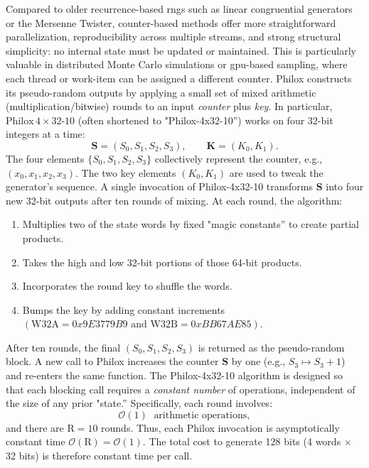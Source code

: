 Compared to older recurrence-based \acrshort{rng}s such as linear congruential generators or the Mersenne Twister, counter-based methods offer more straightforward parallelization, reproducibility across multiple streams, and strong structural simplicity: no internal state must be updated or maintained. This is particularly valuable in distributed Monte Carlo simulations or \acrshort{gpu}-based sampling, where each thread or work-item can be assigned a different counter. Philox constructs its pseudo-random outputs by applying a small set of mixed arithmetic (multiplication/bitwise) rounds to an input \emph{counter} plus \emph{key}. In particular, \(\mathrm{Philox}\,4\times32\text{-10}\) (often shortened to "Philox-4x32-10”) works on four 32-bit integers at a time:
\[
  \mathbf{S} = (S_0, S_1, S_2, S_3),
  \qquad
  \mathbf{K} = (K_0, K_1).
\]
The four elements \(\{S_0, S_1, S_2, S_3\}\) collectively represent the counter, e.g., \((x_0, x_1, x_2, x_3)\). The two key elements \((K_0, K_1)\) are used to tweak the generator's sequence. A single invocation of Philox-4x32-10 transforms \(\mathbf{S}\) into four new 32-bit outputs after ten rounds of mixing. At each round, the algorithm:
\begin{enumerate}
    \item Multiplies two of the state words by fixed "magic constants” to create partial products.
    \item Takes the high and low 32-bit portions of those 64-bit products.
    \item Incorporates the round key to shuffle the words.
    \item Bumps the key by adding constant increments \((\mathrm{W32A} = 0x9E3779B9 \text{ and } \mathrm{W32B} = 0xBB67AE85)\).
\end{enumerate}
After ten rounds, the final \((S_0, S_1, S_2, S_3)\) is returned as the pseudo-random block. A new call to Philox increases the counter \(\mathbf{S}\) by one (e.g., \(S_3 \mapsto S_3 + 1\)) and re-enters the same function. The Philox-4x32-10 algorithm is designed so that each blocking call requires a \emph{constant number} of operations, independent of the size of any prior "state.” Specifically, each round involves:
\[
  \mathcal{O}(1)\;\text{ arithmetic operations},
\]
and there are \(\mathrm{R} = 10\) rounds. Thus, each Philox invocation is asymptotically constant time \(\mathcal{O}(\mathrm{R}) = \mathcal{O}(1)\). The total cost to generate 128 bits (4 words \(\times\) 32 bits) is therefore constant time per call.

